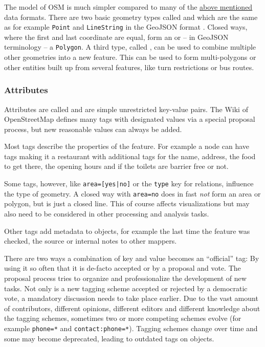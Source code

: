 			The model of OSM is much simpler compared to many of the \hyperref[subsec:file-formats]{above mentioned} data formats.
			There are two basic geometry types called  and  which are the same as for example \texttt{Point} and \texttt{LineString} in the GeoJSON format \cite{osm-wiki-data-model}.
			Closed ways, where the first and last coordinate are equal, form an  or -- in GeoJSON terminology -- a \texttt{Polygon}.
			A third type, called , can be used to combine multiple other geometries into a new feature.
			This can be used to form multi-polygons or other entities built up from several features, like turn restrictions or bus routes.
			
		\subsubsection{Attributes}
		\label{subsubsec:osm-attributes}
			
			Attributes are called  and are simple unrestricted key-value pairs.
			The Wiki of OpenStreetMap defines many tags with designated values via a special proposal process, but new reasonable values can always be added\cite{osm-wiki-proposal-process}.
			
			Most tags describe the properties of the feature.
			For example a node can have tags making it a restaurant with additional tags for the name, address, the food to get there, the opening hours and if the toilets are barrier free or not.
			
			Some tags, however, like \texttt{area=[yes|no]} or the \texttt{type} key for relations, influence the type of geometry.
			A closed way with \texttt{area=no} does in fast \textit{not} form an area or polygon, but is just a closed line.
			This of course affects visualizations but may also need to be considered in other processing and analysis tasks.
			
			Other tags add metadata to objects, for example the last time the feature was checked, the source or internal notes to other mappers.
			
			There are two ways a combination of key and value becomes an \enquote{official} tag:
			By using it so often that it is de-facto accepted or by a proposal and vote.
			The proposal process tries to organize and professionalize the development of new tasks.
			Not only is a new tagging scheme accepted or rejected by a democratic vote, a mandatory discussion needs to take place earlier.
			Due to the vast amount of contributors, different opinions, different editors and different knowledge about the tagging schemes, sometimes two or more competing schemes evolve (for example \texttt{phone=*} and \texttt{contact:phone=*}).
			Tagging schemes change over time and some may become deprecated, leading to outdated tags on objects.
			
